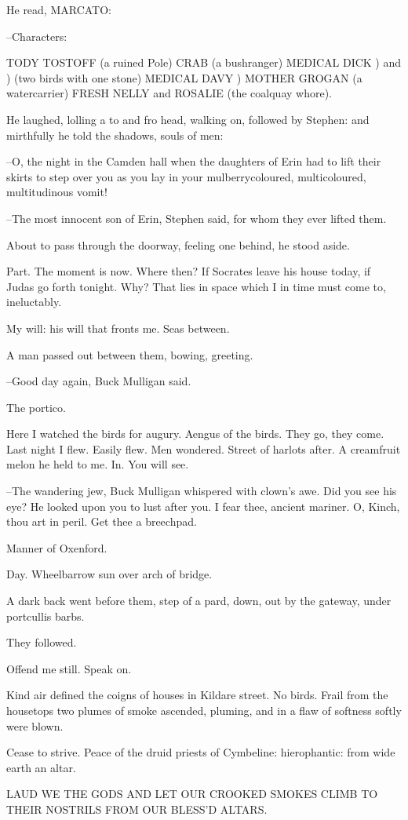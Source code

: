 He read, MARCATO:

--Characters:


    TODY TOSTOFF (a ruined Pole)
    CRAB (a bushranger)
    MEDICAL DICK  )
        and       ) (two birds with one stone)
    MEDICAL DAVY  )
    MOTHER GROGAN (a watercarrier)
    FRESH NELLY
        and
    ROSALIE (the coalquay whore).


He laughed, lolling a to and fro head, walking on, followed by Stephen: and mirthfully he told the shadows, souls of men:

--O, the night in the Camden hall when the daughters of Erin had to lift their skirts to step over you as you lay in your mulberrycoloured, multicoloured, multitudinous vomit!

--The most innocent son of Erin, Stephen said, for whom they ever lifted them.

About to pass through the doorway, feeling one behind, he stood aside.

Part. The moment is now. Where then? If Socrates leave his house today, if Judas go forth tonight. Why? That lies in space which I in time must come to, ineluctably.

My will: his will that fronts me. Seas between.

A man passed out between them, bowing, greeting.

--Good day again, Buck Mulligan said.

The portico.

Here I watched the birds for augury. Aengus of the birds. They go, they come. Last night I flew. Easily flew. Men wondered. Street of harlots after. A creamfruit melon he held to me. In. You will see.

--The wandering jew, Buck Mulligan whispered with clown's awe. Did you see his eye? He looked upon you to lust after you. I fear thee, ancient mariner. O, Kinch, thou art in peril. Get thee a breechpad.

Manner of Oxenford.

Day. Wheelbarrow sun over arch of bridge.

A dark back went before them, step of a pard, down, out by the gateway, under portcullis barbs.

They followed.

Offend me still. Speak on.

Kind air defined the coigns of houses in Kildare street. No birds. Frail from the housetops two plumes of smoke ascended, pluming, and in a flaw of softness softly were blown.

Cease to strive. Peace of the druid priests of Cymbeline: hierophantic: from wide earth an altar.


    LAUD WE THE GODS
    AND LET OUR CROOKED SMOKES CLIMB TO THEIR NOSTRILS
    FROM OUR BLESS'D ALTARS.


